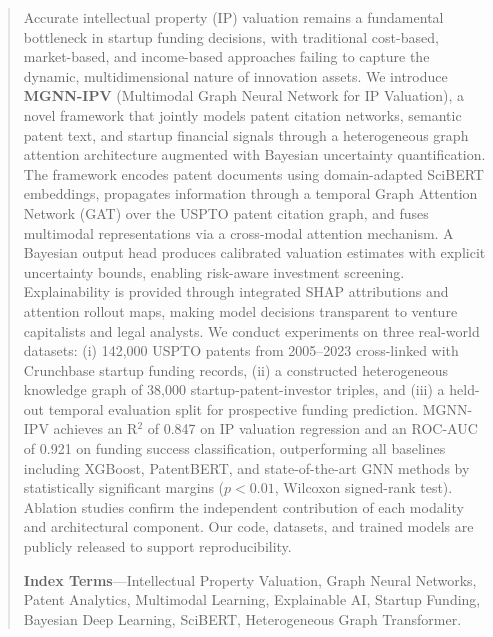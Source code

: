 \documentclass[journal]{IEEEtran}
\begin{document}
\begin{abstract}
Accurate intellectual property (IP) valuation remains a fundamental bottleneck in startup funding decisions, with traditional cost-based, market-based, and income-based approaches failing to capture the dynamic, multidimensional nature of innovation assets. We introduce \textbf{MGNN-IPV} (Multimodal Graph Neural Network for IP Valuation), a novel framework that jointly models patent citation networks, semantic patent text, and startup financial signals through a heterogeneous graph attention architecture augmented with Bayesian uncertainty quantification. The framework encodes patent documents using domain-adapted SciBERT embeddings, propagates information through a temporal Graph Attention Network (GAT) over the USPTO patent citation graph, and fuses multimodal representations via a cross-modal attention mechanism. A Bayesian output head produces calibrated valuation estimates with explicit uncertainty bounds, enabling risk-aware investment screening. Explainability is provided through integrated SHAP attributions and attention rollout maps, making model decisions transparent to venture capitalists and legal analysts. We conduct experiments on three real-world datasets: (i) 142,000 USPTO patents from 2005--2023 cross-linked with Crunchbase startup funding records, (ii) a constructed heterogeneous knowledge graph of 38,000 startup-patent-investor triples, and (iii) a held-out temporal evaluation split for prospective funding prediction. MGNN-IPV achieves an R$^2$ of 0.847 on IP valuation regression and an ROC-AUC of 0.921 on funding success classification, outperforming all baselines including XGBoost, PatentBERT, and state-of-the-art GNN methods by statistically significant margins ($p < 0.01$, Wilcoxon signed-rank test). Ablation studies confirm the independent contribution of each modality and architectural component. Our code, datasets, and trained models are publicly released to support reproducibility.

\textbf{Index Terms}---Intellectual Property Valuation, Graph Neural Networks, Patent Analytics, Multimodal Learning, Explainable AI, Startup Funding, Bayesian Deep Learning, SciBERT, Heterogeneous Graph Transformer.
\end{abstract}

\end{document}
